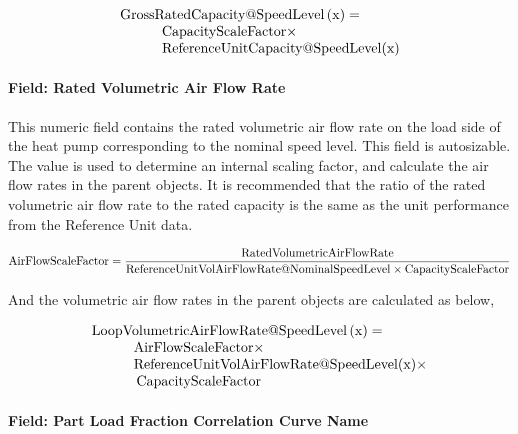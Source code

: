 \begin{equation}
  \begin{array}{l}
    \rm{Gross RatedCapacity} @ \rm{SpeedLevel} \left( \rm{x} \right) = \\
    \quad \quad \quad \rm{CapacityScaleFactor} \times \\
    \quad \quad \quad \rm{ReferenceUnitCapacity} @ \rm{SpeedLevel}(\rm{x})
  \end{array}
\end{equation}

\paragraph{Field: Rated Volumetric Air Flow Rate}\label{field-rated-volumetric-air-flow-rate}

This numeric field contains the rated volumetric air flow rate on the load side of the heat pump corresponding to the nominal speed level. This field is autosizable. The value is used to determine an internal scaling factor, and calculate the air flow rates in the parent objects. It is recommended that the ratio of the rated volumetric air flow rate to the rated capacity is the same as the unit performance from the Reference Unit data.

\begin{equation}
{\rm{AirFlowScaleFactor}} = \frac{{{\rm{RatedVolumetricAirFlowRate}}}}{{{\rm{ReferenceUnitVolAirFlowRate}}@{\rm{NominalSpeedLevel}} \times {\rm{CapacityScaleFactor}}}}
\end{equation}

And the volumetric air flow rates in the parent objects are calculated as below,

\begin{equation}
  \begin{array}{l}
    {\rm{LoopVolumetricAirFlowRate}}@{\rm{SpeedLevel}}\left( {\rm{x}} \right) = \\
    \quad \quad \quad {\rm{AirFlowScaleFactor}} \times \\
    \quad \quad \quad {\rm{ReferenceUnitVolAirFlowRate}}@{\rm{SpeedLevel}}({\rm{x}}) \times \\
    \quad {\kern 1pt} {\kern 1pt} \quad \quad {\rm{CapacityScaleFactor}}
  \end{array}
\end{equation}

\paragraph{Field: Part Load Fraction Correlation Curve Name}\label{field-part-load-fraction-correlation-curve-name-7}

